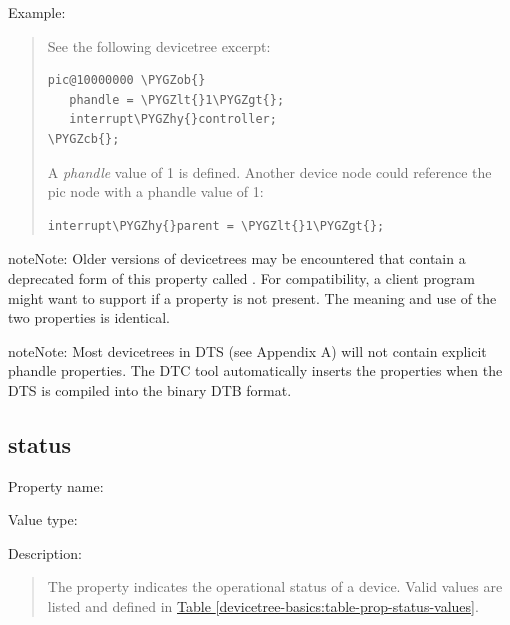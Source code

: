 \documentclass[a4paper,10pt,oneside]{sphinxmanual}
\def\PYGZob{\char`\{}
\def\PYGZcb{\char`\}}
\def\PYGZlt{\char`\<}
\def\PYGZgt{\char`\>}
\def\PYGZhy{\char`\-}
\begin{document}
Example:
\begin{quote}

See the following devicetree excerpt:

\begin{Verbatim}[commandchars=\\\{\}]
pic@10000000 \PYGZob{}
   phandle = \PYGZlt{}1\PYGZgt{};
   interrupt\PYGZhy{}controller;
\PYGZcb{};
\end{Verbatim}

A \emph{phandle} value of 1 is defined. Another device node could reference
the pic node with a phandle value of 1:

\begin{Verbatim}[commandchars=\\\{\}]
interrupt\PYGZhy{}parent = \PYGZlt{}1\PYGZgt{};
\end{Verbatim}
\end{quote}

\begin{notice}{note}{Note:}
Older versions of devicetrees may be encountered that contain a
deprecated form of this property called . For
compatibility, a client program might want to support 
if a  property is not present. The meaning and use of the two
properties is identical.
\end{notice}

\begin{notice}{note}{Note:}
Most devicetrees in \textsc{DTS} (see Appendix A) will not
contain explicit phandle properties. The DTC tool automatically inserts
the  properties when the DTS is compiled into the binary DTB
format.
\end{notice}


\subsection{status}
\label{devicetree-basics:status}
Property name: 

Value type: 

Description:
\begin{quote}

The  property indicates the operational status of a device.
Valid values are listed and defined in \hyperref[devicetree-basics:table-prop-status-values]{Table \ref{devicetree-basics:table-prop-status-values}}.
\end{quote}
\end{document}
